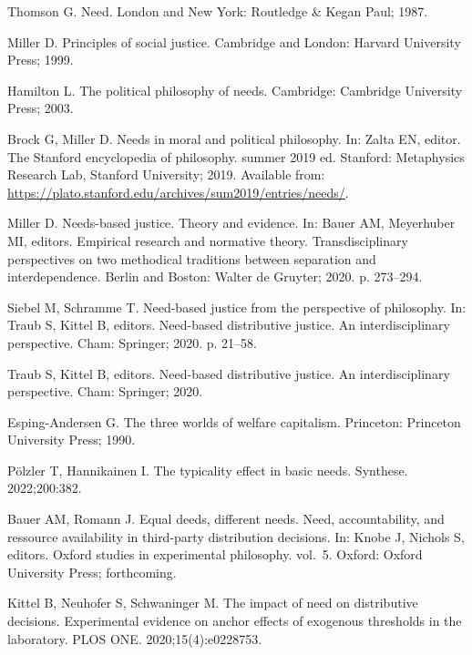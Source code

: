 \documentclass[10pt,letterpaper]{article}
\begin{document}
\begin{thebibliography}{100}
Thomson G.
\newblock Need.
\newblock London and New York: Routledge \& Kegan Paul; 1987.

Miller D.
\newblock Principles of social justice.
\newblock Cambridge and London: Harvard University Press; 1999.

Hamilton L.
\newblock The political philosophy of needs.
\newblock Cambridge: Cambridge University Press; 2003.

Brock G, Miller D.
\newblock Needs in moral and political philosophy.
\newblock In: Zalta EN, editor. The {Stanford} encyclopedia of philosophy.
  summer 2019 ed. Stanford: Metaphysics Research Lab, Stanford University;
  2019. Available from:
  \url{https://plato.stanford.edu/archives/sum2019/entries/needs/}.

Miller D.
\newblock Needs-based justice. {Theory} and evidence.
\newblock In: Bauer AM, Meyerhuber MI, editors. Empirical research and
  normative theory. {Transdisciplinary} perspectives on two methodical
  traditions between separation and interdependence. Berlin and Boston: Walter
  de Gruyter; 2020. p. 273--294.

Siebel M, Schramme T.
\newblock Need-based justice from the perspective of philosophy.
\newblock In: Traub S, Kittel B, editors. Need-based distributive justice. {An}
  interdisciplinary perspective. Cham: Springer; 2020. p. 21--58.

Traub S, Kittel B, editors.
\newblock Need-based distributive justice. {An} interdisciplinary perspective.
\newblock Cham: Springer; 2020.

Esping-Andersen G.
\newblock The three worlds of welfare capitalism.
\newblock Princeton: Princeton University Press; 1990.

Pölzler T, Hannikainen I.
\newblock The typicality effect in basic needs.
\newblock Synthese. 2022;200:382.

Bauer AM, Romann J.
\newblock Equal deeds, different needs. {Need}, accountability, and ressource
  availability in third-party distribution decisions.
\newblock In: Knobe J, Nichols S, editors. Oxford studies in experimental
  philosophy. vol.~5. Oxford: Oxford University Press; forthcoming.

Kittel B, Neuhofer S, Schwaninger M.
\newblock The impact of need on distributive decisions. {Experimental} evidence
  on anchor effects of exogenous thresholds in the laboratory.
\newblock PLOS ONE. 2020;15(4):e0228753.


\end{thebibliography}
\end{document}

